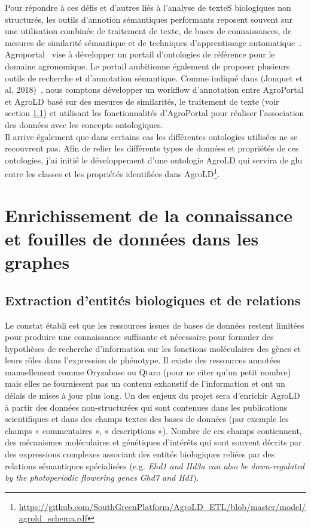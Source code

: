 Pour répondre à ces défis et d'autres liés à l'analyse de texteS biologiques non structurés, les outils d'annotion sémantiques performants reposent souvent sur une utilisation combinée de traitement de texte, de bases de connaissances, de mesures de similarité sémantique et de techniques d'apprentissage automatique~\cite{Jovanovic2017a}. Agroportal~\cite{Jonquet2018} vise à développer un portail d'ontologies de référence pour le domaine agronomique. Le portail ambitionne également de proposer plusieurs outils de recherche et d'annotation sémantique. Comme indiqué dans (Jonquet et al, 2018)~\cite{Jonquet2018}, nous comptons développer un workflow d’annotation entre AgroPortal et AgroLD basé sur des mesures de similarités, le traitement de texte (voir section \ref{NLP}) et utilisant les fonctionnalités d’AgroPortal pour réaliser l’association des données avec les concepts ontologiques. \\

Il arrive également que dans certains cas les différentes ontologies utilisées ne se recouvrent pas. Afin de relier les différents types de données et propriétés de ces ontologies, j'ai initié le développement d’une ontologie AgroLD qui servira de glu entre les classes et les propriétés identifiées dans AgroLD\footnote{\url{https://github.com/SouthGreenPlatform/AgroLD_ETL/blob/master/model/agrold\_schema.rdf}}. \\


\section{Enrichissement de la connaissance et fouilles de données dans les graphes}

\subsection{Extraction d’entités biologiques et de relations}
\label{NLP}

Le constat établi est que les ressources issues de bases de données restent limitées pour produire une connaissance suffisante et nécessaire pour formuler des hypothèses de recherche d’information sur les fonctions moléculaires des gènes et leurs rôles dans l’expression de phénotype. Il existe des ressources annotées manuellement comme Oryzabase ou Qtaro (pour ne citer qu'un petit nombre) mais elles ne fournissent pas un contenu exhaustif de l'information et ont un délais de mises à jour plus long. Un des enjeux du projet sera d'enrichir AgroLD à partir des données non-structurées qui sont contenues dans les publications scientifiques et dans des champs textes des bases de données (par exemple les champs « commentaires », « descriptions »). Nombre de ces champs contiennent, des mécanismes moléculaires et génétiques d’intérêts qui sont souvent décrits par des expressions complexes associant des entités biologiques reliées par des relations sémantiques spécialisées (e.g. \textit{Ehd1 and Hd3a can also be down-regulated by the photoperiodic flowering genes Ghd7 and Hd1}).\\

